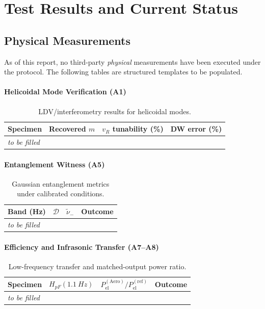\documentclass[11pt]{article}
\begin{document}
\section{Test Results and Current Status}
\subsection{Physical Measurements}
As of this report, no third-party \emph{physical} measurements have been executed under the protocol. The following tables are structured templates to be populated.

\paragraph{Helicoidal Mode Verification (A1)}
\begin{table}[h]
\centering
\begin{tabular}{lccc}
\toprule
Specimen & Recovered $m$ & $v_R$ tunability (\%) & DW error (\%)\\
\midrule
\emph{to be filled} & & & \\
\bottomrule
\end{tabular}
\caption{LDV/interferometry results for helicoidal modes.}
\end{table}

\paragraph{Entanglement Witness (A5)}
\begin{table}[h]
\centering
\begin{tabular}{lccc}
\toprule
Band (Hz) & $\mathcal D$ & $\tilde\nu_-$ & Outcome \\
\midrule
\emph{to be filled} & & & \\
\bottomrule
\end{tabular}
\caption{Gaussian entanglement metrics under calibrated conditions.}
\end{table}

\paragraph{Efficiency and Infrasonic Transfer (A7--A8)}
\begin{table}[h]
\centering
\begin{tabular}{lccc}
\toprule
Specimen & $H_{pF}(\SI{1.1}{Hz})$ & $P_{\mathrm{el}}^{(\mathrm{Aero})}/P_{\mathrm{el}}^{(\mathrm{ref})}$ & Outcome \\
\midrule
\emph{to be filled} & & & \\
\bottomrule
\end{tabular}
\caption{Low-frequency transfer and matched-output power ratio.}
\end{table}
\end{document}
